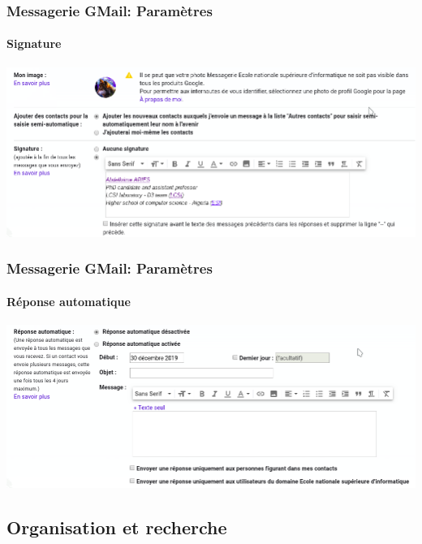 \documentclass[xcolor=table]{beamer}
\begin{document}
\begin{frame}
\frametitle{Messagerie GMail: Paramètres}
\framesubtitle{Signature}

\includegraphics[width=.60\textwidth]{..//img/Bweb02-ri-gmail/gmail-parametre-signature.png}

\end{frame}

\begin{frame}
\frametitle{Messagerie GMail: Paramètres}
\framesubtitle{Réponse automatique}

\includegraphics[width=.60\textwidth]{..//img/Bweb02-ri-gmail/gmail-parametre-reponse.png}

\end{frame}

\subsection{Organisation et recherche}
\end{document}
